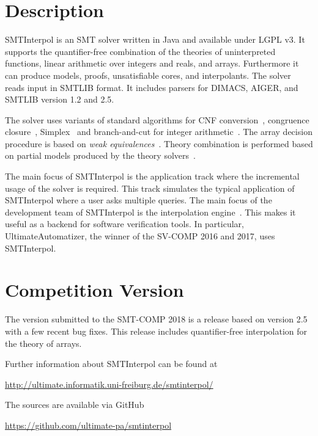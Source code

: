\documentclass[a4]{article}
\title{\SI\\{\large Version \version}}
\author{Jochen Hoenicke, Tanja Schindler\\
  University of Freiburg\\
  \texttt{\{hoenicke,schindle\}@informatik.uni-freiburg.de}}
\date{\today}
\newcommand\SI{SMTInterpol\xspace}
\begin{document}
\maketitle
\section*{Description}
\SI is an SMT solver written in Java and available under LGPL v3.  It supports
the quantifier-free combination of the theories of uninterpreted functions,
linear arithmetic over integers and reals, and arrays.  Furthermore it can
produce models, proofs, unsatisfiable cores, and interpolants.  The solver
reads input in SMTLIB format.  It includes parsers for DIMACS, AIGER, and
SMTLIB version 1.2 and 2.5.

The solver uses variants of standard algorithms for CNF
conversion~\cite{DBLP:journals/jsc/PlaistedG86}, congruence
closure~\cite{DBLP:conf/rta/NieuwenhuisO05}, Simplex~\cite{DBLP:conf/cav/DutertreM06} and
branch-and-cut for integer arithmetic~\cite{DBLP:conf/cav/ChristH15,DBLP:conf/cav/DilligDA09}.
The array decision procedure is based on \emph{weak equivalences}~\cite{DBLP:conf/frocos/ChristH15}.
Theory combination is performed based on partial models produced by the theory
solvers~\cite{DBLP:journals/entcs/MouraB08}.

The main focus of \SI is the application track where the incremental
usage of the solver is required.  This track simulates the typical
application of \SI where a user asks multiple queries.  The main focus
of the development team of \SI is the interpolation
engine~\cite{DBLP:journals/jar/ChristH16,conf/ijcar/HoenickeS18}.  This makes it useful as a
backend for software verification tools.  In particular,
Ultimate\-Automatizer, the winner of the SV-COMP 2016 and 2017, uses \SI.

\section*{Competition Version}
The version submitted to the SMT-COMP 2018 is a release based on
version 2.5 with a few recent bug fixes.  This release includes
quantifier-free interpolation for the theory of arrays.

Further information about \SI can be found at
\begin{center}
  \url{http://ultimate.informatik.uni-freiburg.de/smtinterpol/}
\end{center}
The sources are available via GitHub
\begin{center}
  \url{https://github.com/ultimate-pa/smtinterpol}
\end{center}
\end{document}

